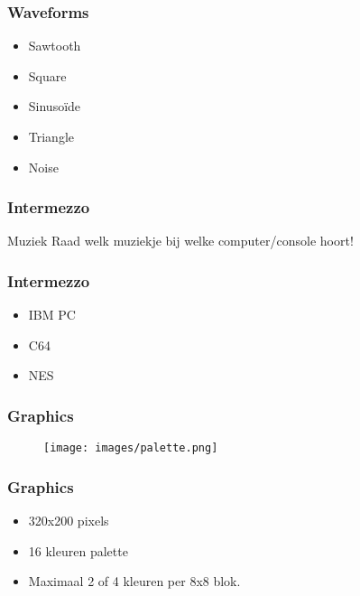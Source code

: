 \documentclass[aspectratio=43]{uva-inf-presentation}
\begin{document}

\begin{frame}
\frametitle{Waveforms}

\begin{itemize}
\item Sawtooth
\item Square
\item Sinuso\"ide
\item Triangle
\item Noise
\end{itemize}

\end{frame}



\begin{frame}
\frametitle{Intermezzo}

\begin{block}{Muziek}
Raad welk muziekje bij welke computer/console hoort!
\end{block}

\end{frame}


\begin{frame}
\frametitle{Intermezzo}

\begin{itemize}
\item IBM PC
\item C64
\item NES
\end{itemize}

\end{frame}


\begin{frame}
\frametitle{Graphics}

\begin{figure}
\texttt{[image: images/palette.png]}
\end{figure}

\end{frame}


\begin{frame}
\frametitle{Graphics}

\begin{itemize}
\item 320x200 pixels
\item 16 kleuren palette
\item Maximaal 2 of 4 kleuren per 8x8 blok.
\end{itemize}

\end{frame}
\end{document}
